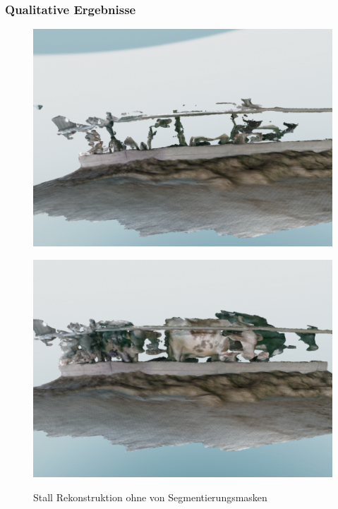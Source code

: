 \documentclass[12pt,DIV=15,BCOR=15mm,twoside,headsepline,abstract=true,listof=totoc,bibliography=totoc]{scrreprt}
\theoremstyle{remark}    %
\begin{document}
    \subsubsection{Qualitative Ergebnisse}
    \begin{figure}[ht]
        \centering
        \begin{minipage}{0.45\textwidth}
            \centering
            \includegraphics[width=\textwidth]{pics/recon_cow_maskout.png}
            \label{fig:recon_cow_maskout}
        \end{minipage}
        \hfill
        \begin{minipage}{0.45\textwidth}
            \centering
            \includegraphics[width=\textwidth]{pics/recon_cow_raw.png}
            \label{fig:recon_cow_raw}
        \end{minipage}
        \caption{Stall Rekonstruktion ohne von Segmentierungsmasken}
        \label{fig:recon_cow}
    \end{figure}\noindent
\end{document}
